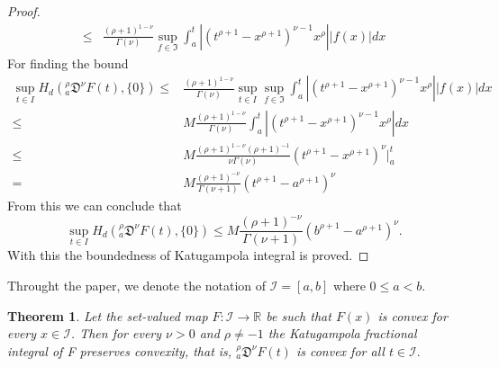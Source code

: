 \documentclass{amsproc}
\newtheorem{theorem}{Theorem}[section]
\theoremstyle{definition}
\theoremstyle{remark}
\numberwithin{equation}{section}
\begin{document}
\begin{proof}
\begin{equation*}
\begin{aligned}
            \le&  \frac{(\rho+1)^{1-\nu}}{\Gamma(\nu)} \sup_{f \in \mathfrak{I}}\int_a^t |(t^{\rho+1}-x^{\rho+1})^{\nu-1}x^{\rho}||f(x)|dx 
              \end{aligned}
    \end{equation*}
    For finding the bound 
    \begin{equation*}
        \begin{aligned}
            \sup_{t \in I} H_d(_a^\rho\mathfrak{D}^\nu F(t),\{0\})\le& \frac{(\rho+1)^{1-\nu}}{\Gamma(\nu)}  \sup_{t \in I}\sup_{f \in \mathfrak{I}}\int_a^t |(t^{\rho+1}-x^{\rho+1})^{\nu-1}x^{\rho}||f(x)|dx \\
            \le&M\frac{(\rho+1)^{1-\nu}}{\Gamma(\nu)}\int_a^t |(t^{\rho+1}-x^{\rho+1})^{\nu-1}x^{\rho}|dx\\
            \le& M\frac{(\rho+1)^{1-\nu}(\rho+1)^{-1}}{\nu\Gamma(\nu)} (t^{\rho+1}-x^{\rho+1})^{\nu}\Big|_a^t\\
            =& M\frac{(\rho+1)^{-\nu}}{\Gamma(\nu+1)} (t^{\rho+1}-a^{\rho+1})^{\nu}
        \end{aligned}
    \end{equation*}
    From this we can conclude that \[\sup_{t \in I} H_d(_a^\rho\mathfrak{D}^\nu F(t),\{0\})\le M\frac{(\rho+1)^{-\nu}}{\Gamma(\nu+1)} (b^{\rho+1}-a^{\rho+1})^{\nu}.\] 
    With this the boundedness of Katugampola integral is proved.
 \end{proof}
 Throught the paper, we denote the notation of $\mathcal{I}=[a,b]$ where $0\leq a<b.$
 \begin{theorem} \label{convex}
     Let the set-valued map $F:\mathcal{I}\to\mathbb{R}$ be such that $F(x)$ is convex for every $x\in \mathcal{I}$. Then for every $\nu > 0$ and $ \rho \neq -1 $ the Katugampola fractional integral of F preserves convexity, that is, $_a^\rho\mathfrak{D}^\nu F(t)$ is convex for all $t\in \mathcal{I}.$
 \end{theorem}
\end{document}
